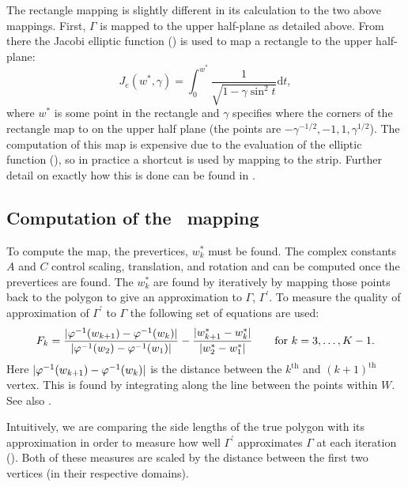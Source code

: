 The rectangle mapping is slightly different in its calculation to the two above mappings. First, $\Gamma$ is mapped to the upper half-plane as detailed above. From there the Jacobi elliptic function (\cite[p. 701]{handbuch}) is used to map a rectangle to the upper half-plane:
\begin{equation*}
J_e(w^*,\gamma)=\int_0^{w^*} \frac{1}{\sqrt{1-\gamma\sin^2t}} \text{d} t,
\end{equation*}
where $w^*$ is some point in the rectangle and $\gamma$ specifies where the corners of the rectangle map to on the upper half plane (the points are $-\gamma^{-1/2}, -1, 1, \gamma^{1/2}$). The computation of this map is expensive due to the evaluation of the elliptic function (\cite[p. 49]{driscoll}), so in practice a shortcut is used by mapping to the strip. Further detail on exactly how this is done can be found in .

\subsection{Computation of the \sch\ mapping}
\label{sc-mapping-problem}

To compute the map, the prevertices, $w^*_k$ must be found. The complex constants $A$ and $C$ control scaling, translation, and rotation and can be computed once the prevertices are found. The $w^*_k$ are found by iteratively by mapping those points back to the polygon to give an approximation to $\Gamma$, $\Gamma^\prime$. To measure the quality of approximation of $\Gamma^\prime$ to $\Gamma$ the following set of equations are used:
\begin{equation}
\label{optimizeme}
F_k = \frac{\vert \varphi^{-1}(w_{k+1}) -  \varphi^{-1}(w_k) \vert}{\vert \varphi^{-1}(w_2)-\varphi^{-1}(w_1)\vert} - \frac{\vert w^*_{k+1} - w^*_k\vert}{\vert w^*_2 - w^*_1\vert} \qquad \text{for } k=3,\dots,K-1.
\end{equation}
Here $\vert \varphi^{-1}(w_{k+1}) -  \varphi^{-1}(w_k) \vert$ is the distance between the $k^{\text{th}}$ and $(k+1)^{\text{th}}$ vertex. This is found by integrating along the line between the points within $W$. See also .

Intuitively, we are comparing the side lengths of the true polygon with its approximation in order to measure how well $\Gamma^\prime$ approximates $\Gamma$ at each iteration (\cite[A-3]{snider}). Both of these measures are scaled by the distance between the first two vertices (in their respective domains).


